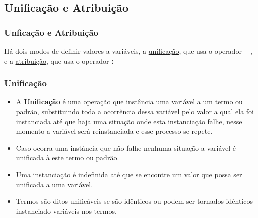 
\subsection{Unificação e Atribuição}
\begin{frame}
	\frametitle{Unficação e Atribuição}
	Há dois modos de definir valores a variáveis, a \underline{unificação}, que usa o operador 
	\textbf{=}, e a \underline{atribuição}, que usa o operador \textbf{:=}
\end{frame}


\begin{frame}[fragile]
	\frametitle{Unificação}
	\begin{itemize}
		
		\item A \textbf{\underline{Unificação}} é uma operação que instância uma variável a um termo ou 
		padrão, substituindo toda a ocorrência dessa variável pelo valor a qual ela foi instanciada até que
		haja uma situação onde esta instanciação falhe, nesse momento a variável será reinstanciada e
		esse processo se repete.
		
		\item Caso ocorra uma instância que não falhe nenhuma situação a variável é unificada à este termo
		ou padrão.
		
		\item Uma instanciação é indefinida até que se encontre um valor que possa ser unificada a uma
		variável.
        
        \item Termos são ditos unificáveis se são idênticos ou podem ser tornados idênticos instanciado 
        variáveis nos termos.
		
	\end{itemize}
	
\end{frame}


